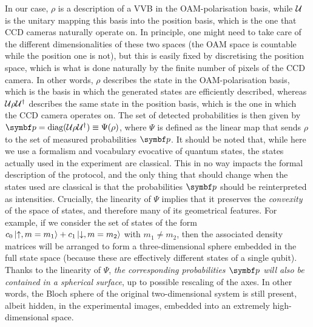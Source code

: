 In our case, $\rho$ is a description of a VVB in the OAM-polarisation basis, while ${\mathcal{U}}$ is the unitary mapping this basis into the position basis, which is the one that CCD cameras naturally operate on. In principle, one might need to take care of the different dimensionalities of these two spaces (the OAM space is countable while the position one is not), but this is easily fixed by discretising the position space, which is what is done naturally by the finite number of pixels of the CCD camera. 
In other words, $\rho$ describes the state in the OAM-polarisation basis, which is the basis in which the generated states are efficiently described, whereas ${\mathcal{U}}\rho{\mathcal{U}}^\dagger$ describes the same state in the position basis, which is the one in which the CCD camera operates on.
The set of detected probabilities is then given by $\bs p=\on{diag}(\calU\rho\calU^\dagger)\equiv\Psi(\rho)$,
where $\Psi$ is defined as the linear map that sends $\rho$ to the set of measured probabilities $\bs p$.
It should be noted that, while here we use a formalism and vocabulary evocative of quantum states, the states actually used in the experiment are classical. This in no way impacts the formal description of the protocol, and the only thing that should change when the states used are classical is that the probabilities $\bs p$ should be reinterpreted as intensities.
Crucially, the linearity of $\Psi$ implies that it preserves the \emph{convexity} of the space of states, and therefore many of its geometrical features.
For example, if we consider the set of states of the form $c_0 \ket{\uparrow,m=m_1} + c_1 \ket{\downarrow,m=m_2}$ with $m_1\neq m_2$, then the associated density matrices will be arranged to form a three-dimensional sphere embedded in the full state space (because these are effectively different states of a single qubit).
Thanks to the linearity of $\Psi$, \emph{the corresponding probabilities $\bs p$ will also be contained in a spherical surface}, up to possible rescaling of the axes.
In other words, the Bloch sphere of the original two-dimensional system is still present, albeit hidden, in the experimental images, embedded into an extremely high-dimensional space.



